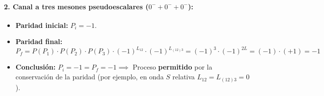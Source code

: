 \begin{problema}
\paragraph{2. Canal a tres mesones pseudoescalares ($0^- + 0^- + 0^-$):}
\begin{itemize}
    \item \textbf{Paridad inicial:} $P_i = -1$.
    \item \textbf{Paridad final:}
    \begin{equation*}
        P_f = P(P_1) \cdot P(P_2) \cdot P(P_3) \cdot (-1)^{L_{12}} \cdot (-1)^{L_{(12)3}} = (-1)^3 \cdot (-1)^{2L} = (-1) \cdot (+1) = -1
    \end{equation*}
    \item \textbf{Conclusión:} $P_i = -1 = P_f = -1 \implies$ Proceso \textbf{permitido} por la conservación de la paridad (por ejemplo, en onda $S$ relativa $L_{12} = L_{(12)3} = 0$).
\end{itemize}
\end{problema}
\newpage
\newpage
